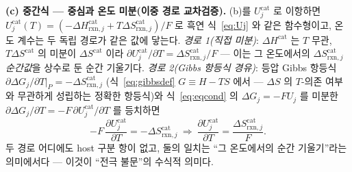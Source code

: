 \documentclass[11pt,a4paper]{article}
\newcommand{\rxn}{\mathrm{rxn}}
\begin{document}
\textbf{(c) 중간식 — 중심과 온도 미분(이중 경로 교차검증).}
(b)를 $U_j^\mathrm{cat}$ 로 이항하면 $U_j^\mathrm{cat}(T)=(-\Delta H_{\rxn,j}^\mathrm{cat}
+T\Delta S_{\rxn,j}^\mathrm{cat})/F$ 로 흑연 식~\eqref{eq:Uj} 와 같은 함수형이고, 온도 계수는 두 독립
경로가 같은 값에 닿는다. \emph{경로 1(직접 미분)}: $\Delta H^\mathrm{cat}$ 는 $T$ 무관, $T\Delta S^\mathrm{cat}$
의 미분이 $\Delta S^\mathrm{cat}$ 이라 $\partial U_j^\mathrm{cat}/\partial T=\Delta S_{\rxn,j}^\mathrm{cat}/F$
— 이는 그 온도에서의 $\Delta S_{\rxn,j}^\mathrm{cat}$ \emph{순간값}을 상수로 둔 순간 기울기다.
\emph{경로 2(Gibbs 항등식 경유)}: 등압 Gibbs 항등식 $\partial\Delta G_j/\partial T|_P=-\Delta S_{\rxn,j}^\mathrm{cat}$
(식~\eqref{eq:gibbsdef} $G\equiv H-TS$ 에서 — $\Delta S$ 의 $T$-의존 여부와 무관하게 성립하는 정확한
항등식)와 식~\eqref{eq:eqcond} 의 $\Delta G_j=-FU_j$ 를 미분한
$\partial\Delta G_j/\partial T=-F\,\partial U_j^\mathrm{cat}/\partial T$ 를 등치하면
\[
-F\,\frac{\partial U_j^\mathrm{cat}}{\partial T}=-\Delta S_{\rxn,j}^\mathrm{cat}
\ \Longrightarrow\
\frac{\partial U_j^\mathrm{cat}}{\partial T}=\frac{\Delta S_{\rxn,j}^\mathrm{cat}}{F}.
\]
두 경로 어디에도 host 구분 항이 없고, 둘의 일치는 ``그 온도에서의 순간 기울기''라는 의미에서다 —
이것이 ``전극 불문''의 수식적 의미다.
\end{document}
